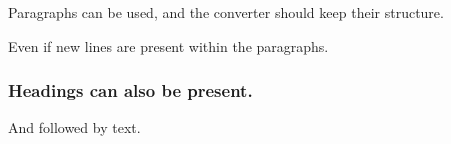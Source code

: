 Paragraphs can be used, and the converter should keep their structure.

Even if new lines
are present within the paragraphs.

\subsubsection{Headings can also be present.}


And followed by text.